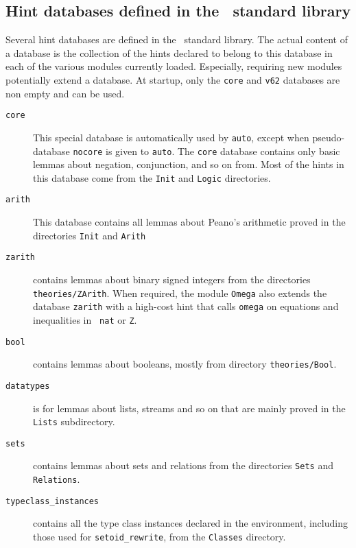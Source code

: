 


\subsection{Hint databases defined in the \Coq\ standard library}

Several hint databases are defined in the \Coq\ standard library.  The
actual content of a database is the collection of the hints declared
to belong to this database in each of the various modules currently
loaded.  Especially, requiring new modules potentially extend a
database. At {\Coq} startup, only the {\tt core} and {\tt v62}
databases are non empty and can be used.

\begin{description}

\item[\tt core] This special database is automatically used by
  \texttt{auto}, except when pseudo-database \texttt{nocore} is
  given to \texttt{auto}. The \texttt{core} database contains
  only basic lemmas about negation,
  conjunction, and so on from. Most of the hints in this database come
  from the \texttt{Init} and \texttt{Logic} directories.

\item[\tt arith] This database contains all lemmas about Peano's
  arithmetic proved in the directories \texttt{Init} and
  \texttt{Arith}

\item[\tt zarith] contains lemmas about binary signed integers from
  the directories \texttt{theories/ZArith}. When required, the module
  {\tt Omega} also extends the database {\tt zarith} with a high-cost
  hint that calls {\tt omega} on equations and inequalities in {\tt
  nat} or {\tt Z}.

\item[\tt bool] contains lemmas about booleans, mostly from directory
  \texttt{theories/Bool}.

\item[\tt datatypes] is for lemmas about lists, streams and so on that
  are mainly proved in the \texttt{Lists} subdirectory.

\item[\tt sets] contains lemmas about sets and relations from the
  directories \texttt{Sets} and \texttt{Relations}.

\item[\tt typeclass\_instances] contains all the type class instances
  declared in the environment, including those used for \texttt{setoid\_rewrite},
  from the \texttt{Classes} directory.
\end{description}

